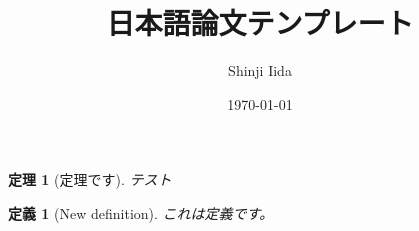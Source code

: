 \documentclass[12pt,dvipdfmx]{jlreq}
\title{日本語論文テンプレート}
\author{Shinji Iida}
\date{\today}
\newtheorem{dfn}{定義}[section]
\newtheorem{thm}{定理}[section]
\begin{document}
\maketitle


\begin{thm}[定理です]
テスト
\end{thm}
   
\begin{dfn}[New definition]
これは定義です。
\end{dfn}

 
 
 
 
 
\end{document}
